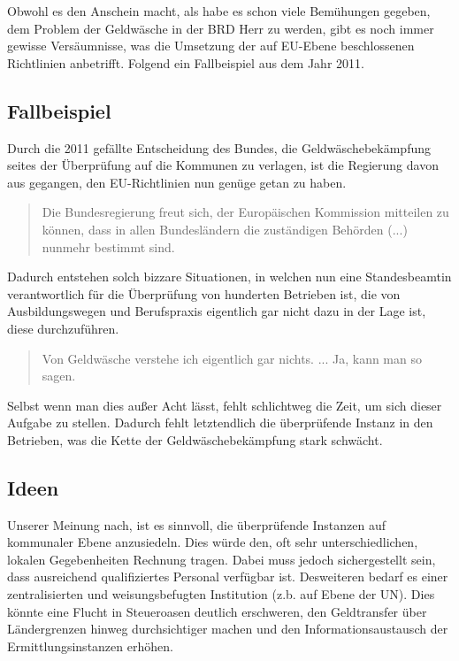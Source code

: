 \documentclass{article}
\begin{document}
        Obwohl es den Anschein macht, als habe es schon viele Bemühungen gegeben, dem Problem der Geldwäsche in der BRD Herr zu werden, gibt es noch immer gewisse Versäumnisse, was die Umsetzung der auf EU-Ebene beschlossenen Richtlinien anbetrifft. Folgend ein Fallbeispiel aus dem Jahr 2011.

        \subsection[Fallbeispiel]{Fallbeispiel}

            Durch die 2011 gefällte Entscheidung des Bundes, die Geldwäschebekämpfung seites der Überprüfung auf die Kommunen zu verlagen, ist die Regierung davon aus gegangen, den EU-Richtlinien nun genüge getan zu haben.
            \begin{quote} Die Bundesregierung freut sich, der Europäischen Kommission mitteilen zu können, dass in allen Bundesländern die zuständigen Behörden (...) nunmehr bestimmt sind. \cite{EUZeugs} \end{quote}
            Dadurch entstehen solch bizzare Situationen, in welchen nun eine Standesbeamtin verantwortlich für die Überprüfung von hunderten Betrieben ist, die von Ausbildungswegen und Berufspraxis eigentlich gar nicht dazu in der Lage ist, diese durchzuführen. \begin{quote} Von Geldwäsche verstehe ich eigentlich gar nichts. ... Ja, kann man so sagen. \cite{Beatmin} \end{quote} Selbst wenn man dies außer Acht lässt, fehlt schlichtweg die Zeit, um sich dieser Aufgabe zu stellen. Dadurch fehlt letztendlich die überprüfende Instanz in den Betrieben, was die Kette der Geldwäschebekämpfung stark schwächt.

        \subsection[Ideen]{Ideen}

            Unserer Meinung nach, ist es sinnvoll, die überprüfende Instanzen auf kommunaler Ebene anzusiedeln. Dies würde den, oft sehr unterschiedlichen, lokalen Gegebenheiten Rechnung tragen. Dabei muss jedoch sichergestellt sein, dass ausreichend qualifiziertes Personal verfügbar ist.
            Desweiteren bedarf es einer zentralisierten und weisungsbefugten Institution (z.b. auf Ebene der UN). Dies könnte eine Flucht in Steueroasen deutlich erschweren, den Geldtransfer über Ländergrenzen hinweg durchsichtiger machen und den Informationsaustausch der Ermittlungsinstanzen erhöhen.
\end{document}
